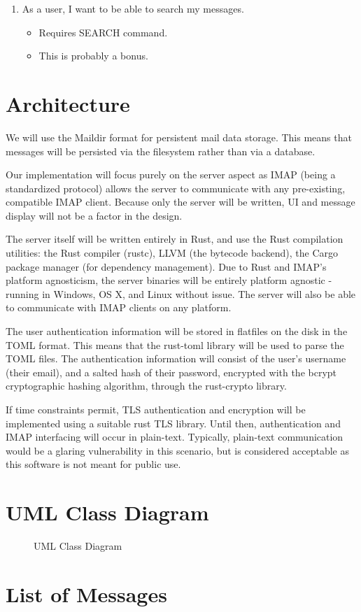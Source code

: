 \documentclass[a4paper,12pt]{article}
\begin{document}
\begin{enumerate}
\item As a user, I want to be able to search my messages.

  \begin{itemize}
  \item Requires SEARCH command.
  \item This is probably a bonus.
  \end{itemize}

\end{enumerate}

\section*{Architecture}

We will use the Maildir format for persistent mail data storage. This means that messages will be persisted via the filesystem rather than via a database.

Our implementation will focus purely on the server aspect as IMAP (being a standardized protocol) allows the server to communicate with any pre-existing, compatible IMAP client. Because only the server will be written, UI and message display will not be a factor in the design.

The server itself will be written entirely in Rust, and use the Rust compilation utilities: the Rust compiler (rustc), LLVM (the bytecode backend), the Cargo package manager (for dependency management). Due to Rust and IMAP's platform agnosticism, the server binaries will be entirely platform agnostic - running in Windows, OS X, and Linux without issue. The server will also be able to communicate with IMAP clients on any platform.

The user authentication information will be stored in flatfiles on the disk in the TOML format. This means that the rust-toml library will be used to parse the TOML files. The authentication information will consist of the user's username (their email), and a salted hash of their password, encrypted with the bcrypt cryptographic hashing algorithm, through the rust-crypto library.

If time constraints permit, TLS authentication and encryption will be implemented using a suitable rust TLS library. Until then, authentication and IMAP interfacing will occur in plain-text. Typically, plain-text communication would be a glaring vulnerability in this scenario, but is considered acceptable as this software is not meant for public use.

\section*{UML Class Diagram}

\begin{figure}[H]
    \centering
    
    \caption{UML Class Diagram}
\end{figure}

\section*{List of Messages}
\end{document}
